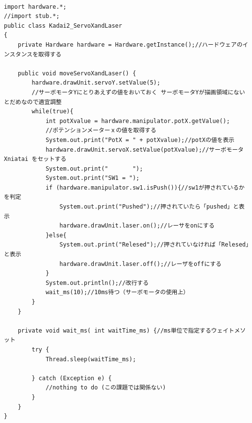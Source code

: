 \documentclass{jarticle}
\begin{document}
\begin{lstlisting}[caption=ServoXandLaser]

import hardware.*;
//import stub.*;
public class Kadai2_ServoXandLaser
{
    private Hardware hardware = Hardware.getInstance();//ハードウェアのインスタンスを取得する

    public void moveServoXandLaser() {
        hardware.drawUnit.servoY.setValue(5);
        //サーボモータYにとりあえずの値をおいておく サーボモータYが描画領域にないとだめなので適宜調整
        while(true){
            int potXvalue = hardware.manipulator.potX.getValue();
            //ポテンションメーターｘの値を取得する
            System.out.print("PotX = " + potXvalue);//potXの値を表示
            hardware.drawUnit.servoX.setValue(potXvalue);//サーボモータXniatai をセットする
            System.out.print("       ");
            System.out.print("SW1 = ");
            if (hardware.manipulator.sw1.isPush()){//sw1が押されているかを判定
                System.out.print("Pushed");//押されていたら「pushed」と表示
                hardware.drawUnit.laser.on();//レーサをonにする
            }else{
                System.out.print("Relesed");//押されていなければ「Relesed」と表示
                hardware.drawUnit.laser.off();//レーザをoffにする
            }
            System.out.println();//改行する
            wait_ms(10);//10ms待つ（サーボモータの使用上）
        }
    }

    private void wait_ms( int waitTime_ms) {//ms単位で指定するウェイトメソット
        try {
            Thread.sleep(waitTime_ms);

        } catch (Exception e) {
            //nothing to do (この課題では関係ない)
        }
    }
}
\end{lstlisting}
\end{document}
